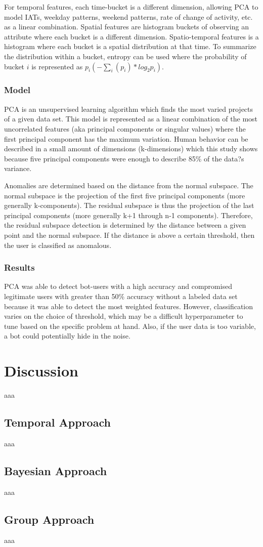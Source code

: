 \documentclass[11pt, oneside]{article}   	%
\begin{document}
\quad For temporal features, each time-bucket is a different dimension, allowing PCA to model IATs, weekday patterns, weekend patterns, rate of change of activity, etc. as a linear combination.
Spatial features are histogram buckets of observing an attribute where each bucket is a different dimension.
Spatio-temporal features is a histogram where each bucket is a spatial distribution at that time.
To summarize the distribution within a bucket, entropy can be used where the probability of bucket $i$ is represented as $p_i (- \sum_i (p_i) * log_2 p_i)$.

\subsubsection*{Model}

\quad PCA is an unsupervised learning algorithm which finds the most varied projects of a given data set.
This model is represented as a linear combination of the most uncorrelated features (aka principal components or singular values) where the first principal component has the maximum variation.
Human behavior can be described in a small amount of dimensions (k-dimensions) which this study shows because five principal components were enough to describe 85\% of the data?s variance.

\quad Anomalies are determined based on the distance from the normal subspace.
The normal subspace is the projection of the first five principal components (more generally k-components).
The residual subspace is thus the projection of the last principal components (more generally k+1 through n-1 components).
Therefore, the residual subspace detection is determined by the distance between a given point and the normal subspace.
If the distance is above a certain threshold, then the user is classified as anomalous.

\subsubsection*{Results}

\quad PCA was able to detect bot-users with a high accuracy and compromised legitimate users with greater than 50\% accuracy without a labeled data set because it was able to detect the most weighted features.
However, classification varies on the choice of threshold, which may be a difficult hyperparameter to tune based on the specific problem at hand.
Also, if the user data is too variable, a bot could potentially hide in the noise.

\section*{Discussion}

aaa

\subsection*{Temporal Approach}

aaa

\subsection*{Bayesian Approach}

aaa

\subsection*{Group Approach}

aaa
\end{document}
